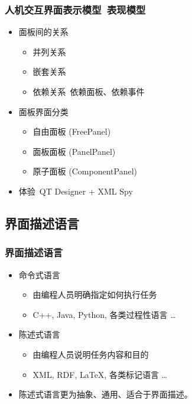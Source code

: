\documentclass{beamer}
\begin{document}
\begin{frame}
	\frametitle{人机交互界面表示模型~{\small 表现模型}}
	\beamertemplatetransparentcovereddynamicmedium
	\begin{itemize}[<+->]
		\item 面板间的关系
		\begin{itemize}
			\item 并列关系
			\item 嵌套关系
			\item 依赖关系~{\tiny 依赖面板、依赖事件}
		\end{itemize}
		\pause
		\item 面板界面分类
		\begin{itemize}
			\item 自由面板 (FreePanel)
			\item 面板面板 (PanelPanel)
			\item 原子面板 (ComponentPanel)
		\end{itemize}
		\pause
		\item 体验~{\tiny QT Designer + XML Spy}
	\end{itemize}
\end{frame}

\subsection{界面描述语言}
\begin{frame}
	\frametitle{界面描述语言}
	\beamertemplatetransparentcovereddynamicmedium
	\begin{itemize}
		\item 命令式语言
		\begin{itemize}
			\item 由编程人员明确指定如何执行任务
			\item C++, Java, Python, 各类过程性语言 \dots
		\end{itemize}
		\pause
		\item 陈述式语言
		\begin{itemize}
			\item 由编程人员说明任务内容和目的
			\item XML, RDF, LaTeX, 各类标记语言 \dots
		\end{itemize}
		\pause
		\item 陈述式语言更为抽象、通用、适合于界面描述。
	\end{itemize}
\end{frame}
\end{document}
